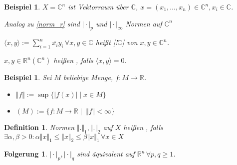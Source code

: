 \documentclass[ngerman,a4paper]{report}
\theoremstyle{break}
\newtheorem{example}[theorem]{Beispiel}
\newtheorem*{definition}{Definition}
\newtheorem{conclusion}[theorem]{Folgerung}
\begin{document}
\begin{example}
	$X=\mathbb{C}^n$ ist Vektorraum über $\mathbb{C}$, $x=(x_1,\dotsc,x_n)\in\mathbb{C}^n, x_i\in\mathbb{C}$.
	
	Analog zu \ref{norm_r} sind $\vert\cdot\vert_p$ und $\vert\cdot\vert_\infty$ Normen auf $\mathbb{C}^n$
	
	$\langle x,y\rangle :=\sum_{i=1}^n \overline{x_i} y_i \,\forall x,y\in\mathbb{C}$ heißt [!$\mathbb{C}$] von $x,y\in\mathbb{C}^n$.
	
	$x,y\in\mathbb{R}^n (\mathbb{C}^n)$ heißen , falls $\langle x,y\rangle = 0$.
\end{example}
\begin{example}
	Sei $M$ beliebige Menge, $f:M\rightarrow \mathbb{R}$.
	\begin{itemize}
		\item $\Vert f \Vert :=\sup\{ \vert f(x)\vert \mid x\in M\}$ 
		\item {}$(M):=\{ f:M\rightarrow \mathbb{R} \mid\; \Vert f \Vert < \infty \}$ 
	\end{itemize}
\end{example}
\begin{definition}
	Normen $\Vert .\Vert_1, \Vert .\Vert_2$ auf $X$ heißen , falls $\exists \alpha,\beta > 0:\alpha \Vert x \Vert_1 \le \Vert x\Vert_2 \le \beta \Vert x\Vert_1 \,\forall x\in X$
\end{definition}
\begin{conclusion}
	$\vert\cdot\vert_p, \vert\cdot\vert_q$ sind äquivalent auf $\mathbb{R}^n\,\forall p,q\ge 1$.
\end{conclusion}
\end{document}

